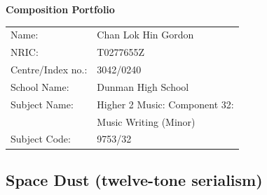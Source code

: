 \documentclass{article}
\begin{document}
\begin{center}
\vspace*{\fill}
\LARGE
    {\bf Composition Portfolio}
\vspace*{\fill}
%
\end{center}
\begin{center}
    \large
\begin{tabular}{ll}
    Name: &Chan Lok Hin Gordon\\
    NRIC: &T0277655Z\\
    Centre/Index no.: &3042/0240\\
    School Name: &Dunman High School\\
    Subject Name: &Higher 2 Music: Component 32:\\
    &Music Writing (Minor)\\
    Subject Code: &9753/32
\end{tabular}
\end{center}

\newpage

\tableofcontents

\newpage

\begin{center}
\vspace*{\fill}
\LARGE
    \section{Space Dust (twelve-tone serialism)}
\vspace*{\fill}
%
\end{center}

\newpage
\end{document}

